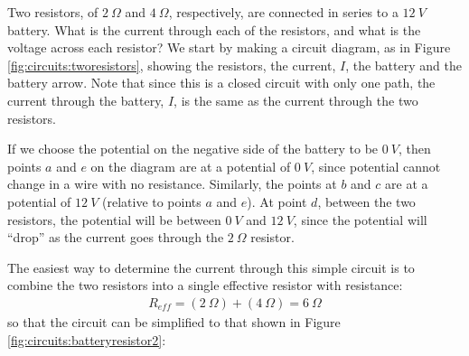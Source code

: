 \begin{example}{\label{ex:circuits:tworesistors}Two resistors, of $\SI{2}{\Omega}$ and $\SI{4}{\Omega}$, respectively, are connected in series to a $\SI{12}{V}$ battery. What is the current through each of the resistors, and what is the voltage across each resistor?}
We start by making a circuit diagram, as in Figure \ref{fig:circuits:tworesistors}, showing the resistors, the current, $I$, the battery and the battery arrow. Note that since this is a closed circuit with only one path, the current through the battery, $I$, is the same as the current through the two resistors.


If we choose the potential on the negative side of the battery to be $\SI{0}{V}$, then points $a$ and $e$ on the diagram are at a potential of $\SI{0}{V}$, since potential cannot change in a wire with no resistance. Similarly, the points at $b$ and $c$ are at a potential of $\SI{12}{V}$ (relative to points $a$ and $e$). At point $d$, between the two resistors, the potential will be between $\SI{0}{V}$ and $\SI{12}{V}$, since the potential will ``drop'' as the current goes through the $\SI{2}{\Omega}$ resistor.

The easiest way to determine the current through this simple circuit is to combine the two resistors into a single effective resistor with resistance:
\begin{align*}
R_{eff}=(\SI{2}{\Omega})+(\SI{4}{\Omega})=\SI{6}{\Omega}
\end{align*}
so that the circuit can be simplified to that shown in Figure \ref{fig:circuits:batteryresistor2}:



\end{example}
